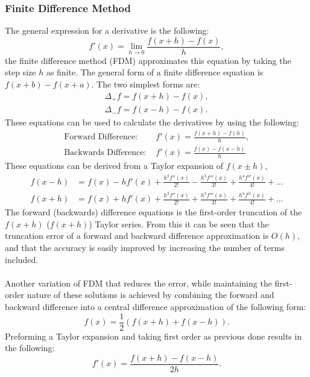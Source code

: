 \documentclass[12pt,a4paper,twoside]{article}
\begin{document}
\subsubsection{Finite Difference Method}
The general expression for a derivative is the following:
\begin{equation}
f'(x)=\lim\limits _{h\to0}\frac{f(x+h)-f(x)}{h} , 
\end{equation}
the finite difference method (FDM) approximates this equation by taking the step size $h$ as finite. The general form of a finite difference equation is $f(x+b)-f(x+a)$. The two simplest forms are:
\begin{align}
\Delta_+ f =  f(x+h)-f(x), \\
\Delta_- f = f(x-h)-f(x) .
\end{align}
These equations can be used to calculate the derivatives by using the following:
\begin{align}
\text{Forward Difference: }&f'(x) = \frac{f(x+h)-f(h)}{h} , \\
\text{Backwards Difference: }&f'(x) = \frac{f(x)-f(x-h)}{h}
\end{align}
These equations can be derived from a Taylor expansion of $f(x\pm h)$,
\begin{align}
f(x-h) & = f(x)-h f'(x)+\frac{h^{2}f''(x)}{2!}-\frac{h^{3}f'''(x)}{3!}+\frac{h^{4}f^{iv}(x)}{4!}+...\label{eq:TaylorForward}\\
f(x+h) & = f(x)+h f'(x)+\frac{h^{2}f''(x)}{2!}+\frac{h^{3}f'''(x)}{3!}+\frac{h^{4}f^{iv}(x)}{4!}+...\label{eq:TaylorBackward}
\end{align}
The forward (backwards) difference equations is the first-order truncation of the $f(x+h)$ ($f(x+h)$) Taylor series. From this it can be seen that the truncation error of a forward and backward difference approximation is $O(h)$, and that the accuracy is easily improved by increasing the number of terms included. \\ \\
Another variation of FDM that reduces the error, while maintaining the first-order nature of these solutions is achieved by combining the forward and backward difference into a central difference approximation of the following form: 
\begin{equation}
f(x)=\frac{1}{2} \left(f(x + h) + f(x - h)\right).
\end{equation}
Preforming a Taylor expansion and taking first order as previous done results in the following: 
\begin{equation}
f'(x)=\frac{f(x+h)-f(x-h)}{2h}.\label{eq:First Order CD}
\end{equation}
\end{document}
